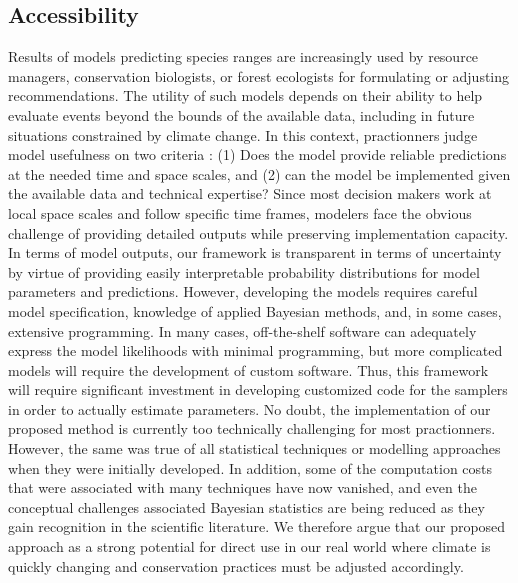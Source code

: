 \subsection*{Accessibility}
Results of models predicting species ranges are increasingly used by resource managers, conservation biologists, or forest ecologists for formulating or adjusting recommendations. 
The utility of such models depends on their ability to help evaluate events beyond the bounds of the available data, including in future situations constrained by climate change. 
In this context, practionners judge model usefulness on two criteria : (1) Does the model provide reliable predictions at the needed time and space scales, and (2) can the model be implemented given the available data and technical expertise? 
Since most decision makers work at local space scales and follow specific time frames, modelers face the obvious challenge of providing detailed outputs while preserving implementation capacity.
In terms of model outputs, our framework is transparent in terms of uncertainty by virtue of providing easily interpretable probability distributions for model parameters and predictions.
However, developing the models requires careful model specification, knowledge of applied Bayesian methods, and, in some cases, extensive programming.
In many cases, off-the-shelf software \citep[e.g.,][]{R, RJAGS} can adequately express the model likelihoods with minimal programming, but more complicated models will require the development of custom software.
Thus, this framework will require significant investment in developing customized code for the samplers in order to actually estimate parameters.
No doubt, the implementation of our proposed method is currently too technically challenging for most practionners. 
However, the same was true of all statistical techniques or modelling approaches when they were initially developed. 
In addition, some of the computation costs that were associated with many techniques have now vanished, and even the conceptual challenges associated Bayesian statistics are being reduced as they gain recognition in the scientific literature. 
We therefore argue that our proposed approach as a strong potential for direct use in our real world where climate is quickly changing and conservation practices must be adjusted accordingly.

